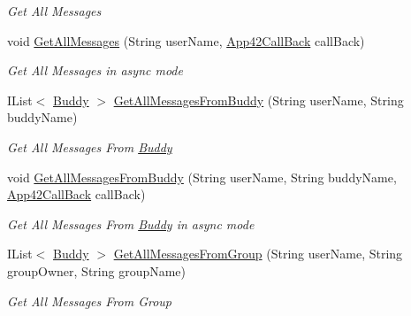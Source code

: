 \begin{DoxyCompactItemize}
\begin{DoxyCompactList}\small\item\em Get All Messages \end{DoxyCompactList}\item 
void \hyperlink{classcom_1_1shephertz_1_1app42_1_1paas_1_1sdk_1_1csharp_1_1buddy_1_1_buddy_service_a35b8447a9e8489d3b18897ce720f5f0b}{Get\+All\+Messages} (String user\+Name, \hyperlink{interfacecom_1_1shephertz_1_1app42_1_1paas_1_1sdk_1_1csharp_1_1_app42_call_back}{App42\+Call\+Back} call\+Back)
\begin{DoxyCompactList}\small\item\em Get All Messages in async mode \end{DoxyCompactList}\item 
I\+List$<$ \hyperlink{classcom_1_1shephertz_1_1app42_1_1paas_1_1sdk_1_1csharp_1_1buddy_1_1_buddy}{Buddy} $>$ \hyperlink{classcom_1_1shephertz_1_1app42_1_1paas_1_1sdk_1_1csharp_1_1buddy_1_1_buddy_service_ae708e496b377faee289aa328b769d893}{Get\+All\+Messages\+From\+Buddy} (String user\+Name, String buddy\+Name)
\begin{DoxyCompactList}\small\item\em Get All Messages From \hyperlink{classcom_1_1shephertz_1_1app42_1_1paas_1_1sdk_1_1csharp_1_1buddy_1_1_buddy}{Buddy} \end{DoxyCompactList}\item 
void \hyperlink{classcom_1_1shephertz_1_1app42_1_1paas_1_1sdk_1_1csharp_1_1buddy_1_1_buddy_service_af0dd01d74bcafd587c6de484fa2cde9e}{Get\+All\+Messages\+From\+Buddy} (String user\+Name, String buddy\+Name, \hyperlink{interfacecom_1_1shephertz_1_1app42_1_1paas_1_1sdk_1_1csharp_1_1_app42_call_back}{App42\+Call\+Back} call\+Back)
\begin{DoxyCompactList}\small\item\em Get All Messages From \hyperlink{classcom_1_1shephertz_1_1app42_1_1paas_1_1sdk_1_1csharp_1_1buddy_1_1_buddy}{Buddy} in async mode \end{DoxyCompactList}\item 
I\+List$<$ \hyperlink{classcom_1_1shephertz_1_1app42_1_1paas_1_1sdk_1_1csharp_1_1buddy_1_1_buddy}{Buddy} $>$ \hyperlink{classcom_1_1shephertz_1_1app42_1_1paas_1_1sdk_1_1csharp_1_1buddy_1_1_buddy_service_adaa8a222a491650fe1c7615909818682}{Get\+All\+Messages\+From\+Group} (String user\+Name, String group\+Owner, String group\+Name)
\begin{DoxyCompactList}\small\item\em Get All Messages From Group \end{DoxyCompactList}\item 

\end{DoxyCompactItemize}
